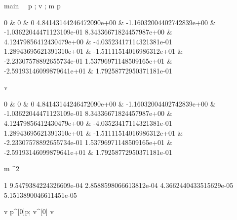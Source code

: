 \documentclass[12pt,a4paper]{book}
\begin{document}
\begin{eqcode}{main}{\ }{\ }{}
    p \in {};
    v \in {};
    m \in {} \lend
    p \gets \begin{tmatrix}
            0 & 0 & 0 \lend
            4.84143144246472090e+00 & -1.16032004402742839e+00 &
            -1.03622044471123109e-01 \lend
            8.34336671824457987e+00 & 4.12479856412430479e+00 &
            -4.03523417114321381e-01 \lend
            1.28943695621391310e+01 & -1.51111514016986312e+01 &
            -2.23307578892655734e-01 \lend
            1.53796971148509165e+01 & -2.59193146099879641e+01 &
            1.79258772950371181e-01 \lend 
        \end{tmatrix} \lend
    v  \cdot
        \begin{tmatrix}
            0 & 0 & 0 \lend
            4.84143144246472090e+00 & -1.16032004402742839e+00 &
            -1.03622044471123109e-01 \lend
            8.34336671824457987e+00 & 4.12479856412430479e+00 &
            -4.03523417114321381e-01 \lend
            1.28943695621391310e+01 & -1.51111514016986312e+01 &
            -2.23307578892655734e-01 \lend
            1.53796971148509165e+01 & -2.59193146099879641e+01 &
            1.79258772950371181e-01 \lend 
        \end{tmatrix} \lend
    m  \cdot \pi^2 \cdot 
        \begin{tmatrix}
            1 \lend
            9.5479384224326609e-04 \lend
            2.8588598066613812e-04 \lend
            4.3662440433515629e-05 \lend
            5.1513890046611451e-05 \lend
        \end{tmatrix} \lend
    v \gets {} \lend
    p^{[0]}\gets p; v^{[0]} \gets v \lend
     \lend
\end{eqcode}
\end{document}
